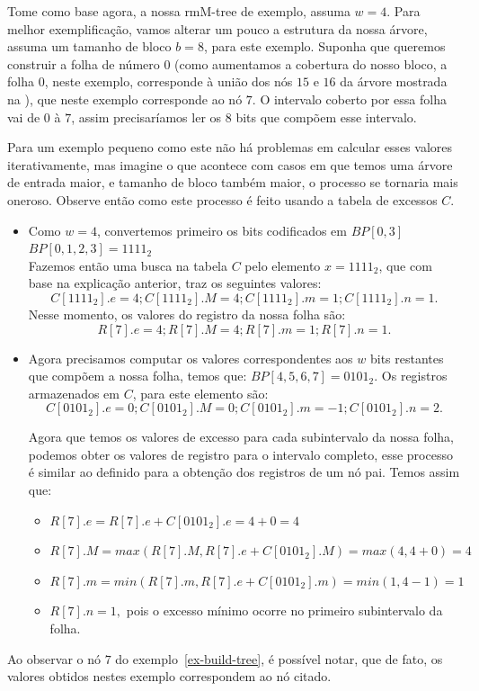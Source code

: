 \begin{example}
    Tome como base agora, a nossa rmM-tree de exemplo, assuma $w=4$. Para melhor exemplificação, vamos alterar um pouco a estrutura da nossa árvore, assuma um tamanho de bloco  $b=8$, para este exemplo. Suponha que queremos construir a folha de número $0$ (como aumentamos a cobertura do nosso bloco, a folha $0$, neste exemplo, corresponde à união dos nós $15$ e $16$ da árvore mostrada na ), que neste exemplo corresponde ao nó $7$. O intervalo coberto por essa folha vai de $0$ à $7$, assim precisaríamos ler os $8$ bits que compõem esse intervalo. 
    
    Para um exemplo pequeno como  este não há problemas em calcular esses valores iterativamente, mas imagine o que acontece com casos em que temos uma árvore de entrada maior, e tamanho de  bloco também maior, o processo se tornaria mais oneroso. Observe então como este processo é feito usando a tabela de excessos $C$.


    \begin{itemize}
        \item Como $w=4$, convertemos primeiro os bits codificados em $BP[0,3]$\\
        $BP[0,1,2,3] = 1111_2$\\
        Fazemos então uma busca na tabela $C$ pelo elemento $x = 1111_2$, que com base na explicação anterior, traz os seguintes valores:
        $$C[1111_2].e = 4; C[1111_2].M = 4; C[1111_2].m = 1; C[1111_2].n=1.$$
        Nesse momento, os valores do registro da nossa folha são:\\
        $$R[7].e = 4; R[7].M = 4; R[7].m = 1; R[7].n=1.$$
        \item  Agora precisamos computar os valores correspondentes aos $w$ bits restantes que compõem a nossa folha, temos que:
        $BP[4,5,6,7] = 0101_2$. Os registros armazenados em $C$, para este elemento são:
        $$C[0101_2].e = 0; C[0101_2].M = 0; C[0101_2].m = -1; C[0101_2].n=2.$$

        Agora que temos os valores de excesso para cada subintervalo da nossa folha, podemos obter os valores de registro para o intervalo completo, esse processo é similar ao definido para a obtenção dos registros de um nó pai. Temos assim que:
        \begin{itemize}
            \item $R[7].e = R[7].e + C[0101_2].e = 4 + 0 = 4$
            \item $R[7].M = max(R[7].M, R[7].e + C[0101_2].M) =  max(4,4+0) =4$
            \item $R[7].m = min(R[7].m, R[7].e + C[0101_2].m) = min(1,4-1) = 1$
            \item $R[7].n=1,$ pois o excesso mínimo ocorre no primeiro subintervalo da folha.
        \end{itemize}
    \end{itemize}

    Ao observar o nó $7$ do exemplo~\ref{ex-build-tree}, é possível notar, que de fato, os valores obtidos nestes exemplo correspondem ao nó citado.
\end{example}

